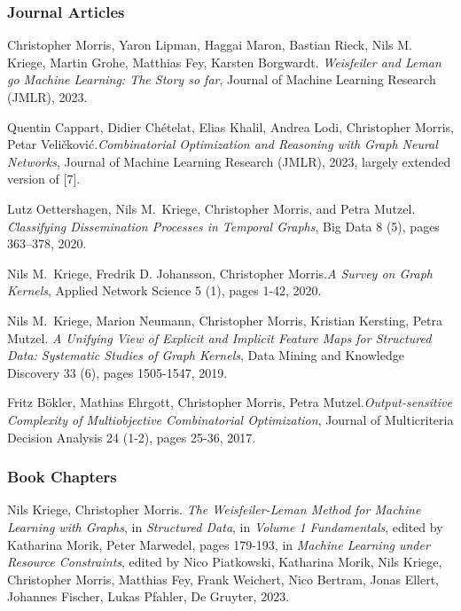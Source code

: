 \documentclass[11pt, a4paper, DIV=14, headings=small]{scrartcl}
\begin{document}
\begin{thebibliography}{15}
		\subsubsection*{Journal Articles}
		Christopher Morris, Yaron Lipman, Haggai Maron, Bastian Rieck, Nils M. Kriege, Martin Grohe, Matthias Fey, Karsten Borgwardt.
		\emph{Weisfeiler and Leman go Machine Learning: The Story so far}, Journal of Machine Learning Research (JMLR), 2023.
		
		Quentin Cappart, Didier Chételat, Elias Khalil, Andrea Lodi, Christopher Morris, Petar Veli\v{c}kovi\'{c}.\footnotemark[2]
		\emph{Combinatorial Optimization and Reasoning with Graph Neural Networks},
		Journal of Machine Learning Research (JMLR), 2023, largely extended version of [7].
		
		Lutz Oettershagen, Nils M.~Kriege, Christopher Morris, and Petra Mutzel.
		\emph{Classifying Dissemination Processes in Temporal Graphs},
		Big Data 8 (5), pages 363--378, 2020.
		
		Nils M.~Kriege,  Fredrik D. Johansson, Christopher Morris.\footnotemark[2]
		\emph{A Survey on Graph Kernels},
		Applied Network Science 5 (1), pages 1-42, 2020.
		
		Nils M.~Kriege,  Marion Neumann, Christopher Morris, Kristian Kersting, Petra Mutzel.
		\emph{A Unifying View of Explicit and Implicit Feature Maps for Structured Data: Systematic Studies of Graph Kernels},
		Data Mining and Knowledge Discovery 33 (6), pages 1505-1547, 2019.
		
		Fritz B\"okler, Mathias Ehrgott, Christopher Morris, Petra Mutzel.\footnotemark[1]
		\emph{Output-sensitive Complexity of Multiobjective Combinatorial Optimization},
		Journal of Multicriteria Decision Analysis 24 (1-2), pages 25-36, 2017.
		
		\subsubsection*{Book Chapters}
		
		Nils Kriege, Christopher Morris.
		\emph{The Weisfeiler-Leman Method for Machine Learning with Graphs},
		in \emph{Structured Data}, in \emph{Volume 1 Fundamentals}, edited by Katharina Morik, Peter Marwedel, pages 179-193, in \emph{Machine Learning under Resource Constraints},
		edited by Nico Piatkowski, Katharina Morik, Nils Kriege, Christopher Morris, Matthias Fey, Frank Weichert, Nico Bertram, Jonas Ellert, Johannes Fischer, Lukas Pfahler, De Gruyter, 2023.
		

\end{thebibliography}
\end{document}
